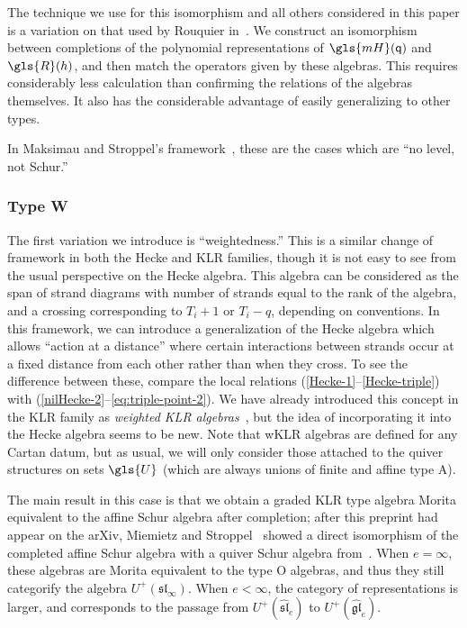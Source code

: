 \documentclass[ALCO,ThmDefs,Unicode,epreuves]{cedram}
\newcommand{\pq}{\mathsf{q}}
\begin{document}
The technique we use for this isomorphism and all others considered in
this paper is a variation on that
used by Rouquier in~\cite[\S~3.26]{Rou2KM}. We construct an isomorphism between
 completions of the polynomial representations of $\gls{mH}(\pq)$ and $\gls{R}(h)$,
 and then match the operators given by these algebras. This
 requires considerably less calculation than confirming the relations
 of the algebras themselves. It also has the considerable advantage of
 easily generalizing to other types.

 In Maksimau and Stroppel's framework~\cite{MS18}, these are the cases which are
 ``no level, not Schur.''

\subsubsection*{Type W} 
The first variation we introduce is ``weightedness.'' This is a
similar change of framework in both the Hecke and KLR families, though
it is not easy to see from the usual perspective on the Hecke algebra. This algebra
can be considered as the span of strand diagrams with number of strands equal to
the rank of the algebra, and a crossing corresponding to $T_i+1$ or
$T_i-q$, depending on conventions. In this framework, we can
introduce a generalization of the Hecke algebra which allows ``action
at a distance'' where certain interactions between strands occur at a
fixed distance from each other rather than when they cross. To see
the difference between these, compare the local relations
(\ref{Hecke-1}--\ref{Hecke-triple}) with
(\ref{nilHecke-2}--\ref{eq:triple-point-2}). We have already
introduced this concept in the KLR family as \emph{weighted KLR
 algebras}~\cite{WebwKLR}, but the idea of incorporating it into the
Hecke algebra seems to be new. Note that wKLR algebras are defined
for any Cartan datum, but as usual, we will only consider those
attached to the quiver structures on sets $\gls{U}$ (which are always unions
of finite and affine type A).

 The main result in this case is
that we obtain a graded KLR type algebra Morita equivalent to the
affine Schur algebra after completion; after this preprint had appear on the arXiv,
Miemietz and Stroppel~\cite{MiSt} showed a direct isomorphism of the \hbox{completed} affine Schur
algebra with a quiver Schur algebra from~\cite{SWschur}.
When $e=\infty$, these algebras are Morita equivalent to the type O
algebras, and thus they still categorify the algebra
$U^+(\mathfrak{sl}_\infty)$. When $e <\infty$, the category of
representations is larger, and corresponds to the passage from
$U^+(\mathfrak{\widehat{sl}}_e)$ to
$U^+(\mathfrak{\widehat{gl}}_e)$.
\end{document}
